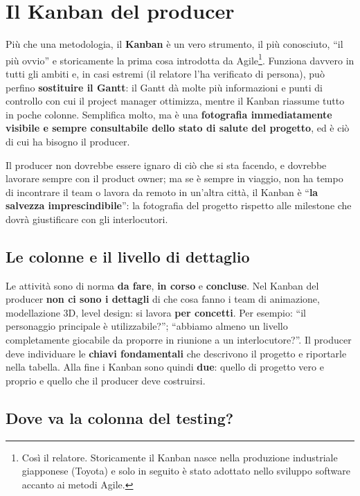 \section{Il Kanban del producer}
\label{sec:z5-kanban}

Più che una metodologia, il \textbf{Kanban} è un vero strumento, il più
conosciuto, ``il più ovvio'' e storicamente la prima cosa introdotta da
Agile\footnote{Così il relatore. Storicamente il Kanban nasce nella produzione
industriale giapponese (Toyota) e solo in seguito è stato adottato nello
sviluppo software accanto ai metodi Agile.}. Funziona davvero in tutti gli
ambiti e, in casi estremi (il relatore l'ha verificato di persona), può
perfino \textbf{sostituire il Gantt}: il Gantt dà molte più informazioni e punti
di controllo con cui il project manager ottimizza, mentre il Kanban riassume
tutto in poche colonne. Semplifica molto, ma è una \textbf{fotografia
immediatamente visibile e sempre consultabile dello stato di salute del
progetto}, ed è ciò di cui ha bisogno il producer.

Il producer non dovrebbe essere ignaro di ciò che si sta facendo, e dovrebbe
lavorare sempre con il product owner; ma se è sempre in viaggio, non ha tempo di
incontrare il team o lavora da remoto in un'altra città, il Kanban è
``\textbf{la salvezza imprescindibile}'': la fotografia del progetto rispetto
alle milestone che dovrà giustificare con gli interlocutori.

\subsection{Le colonne e il livello di dettaglio}

Le attività sono di norma \textbf{da fare}, \textbf{in corso} e
\textbf{concluse}. Nel Kanban del producer \textbf{non ci sono i dettagli} di
che cosa fanno i team di animazione, modellazione 3D, level design: si lavora
\textbf{per concetti}. Per esempio: ``il personaggio principale è
utilizzabile?''; ``abbiamo almeno un livello completamente giocabile da proporre
in riunione a un interlocutore?''. Il producer deve individuare le
\textbf{chiavi fondamentali} che descrivono il progetto e riportarle nella
tabella. Alla fine i Kanban sono quindi \textbf{due}: quello di progetto vero e
proprio e quello che il producer deve costruirsi.

\subsection{Dove va la colonna del testing?}

